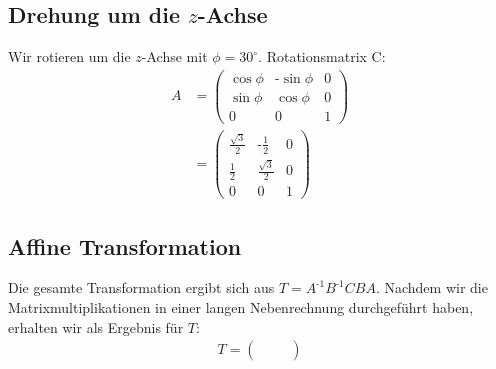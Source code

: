 \documentclass[a4paper]{scrartcl}
\begin{document}
\subsection*{Drehung um die $z$-Achse}
Wir rotieren um die $z$-Achse mit $\phi = 30^\circ$. Rotationsmatrix C:
\begin{align*}
A & = \begin{pmatrix} \cos\phi & \text{-}\sin\phi & 0 \\ \sin\phi & \cos\phi & 0 \\ 0 & 0 & 1 \end{pmatrix}
\\
& = \begin{pmatrix} \frac{\sqrt{3}}{2} & \text{-}\frac{1}{2} & 0 \\ \frac{1}{2} & \frac{\sqrt{3}}{2} & 0 \\ 0 & 0 & 1\end{pmatrix}
\end{align*}

\subsection*{Affine Transformation}
Die gesamte Transformation ergibt sich aus $T = A^{\text{-}1}B^{\text{-}1}CBA$. Nachdem wir die Matrixmultiplikationen in einer langen Nebenrechnung durchgeführt haben, erhalten wir als Ergebnis für $T$:
\begin{align*}
T = 
\begin{pmatrix} 
&
&
\\
&
&
\\
&
&
\end{pmatrix}
\end{align*}
\end{document}
